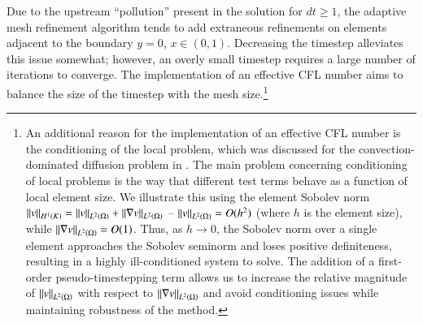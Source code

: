 Due to the upstream ``pollution'' present in the solution for $dt \geq 1$, the adaptive mesh refinement algorithm tends to add extraneous refinements on elements adjacent to the boundary $y = 0$, $x\in (0,1)$.  Decreasing the timestep alleviates this issue somewhat; however, an overly small timestep requires a large number of iterations to converge.  The implementation of an effective CFL number aims to balance the size of the timestep with the mesh size.\footnote{An additional reason for the implementation of an effective CFL number is the conditioning of the local problem, which was discussed for the convection-dominated diffusion problem in \cite{DPG3}.  The main problem concerning conditioning of local problems is the way that different test terms behave as a function of local element size.  We illustrate this using the element Sobolev norm $\nor{v}_{H^1(K)} = \nor{v}_{\L} + \nor{\grad v}_{\L}$ -- $\nor{v}_{\L} = O(h^2)$ (where $h$ is the element size), while $\nor{\grad v}_{\L} = O(1)$.  Thus, as $h\rightarrow 0$, the Sobolev norm over a single element approaches the Sobolev seminorm and loses positive definiteness, resulting in a highly ill-conditioned system to solve.  The addition of a first-order pseudo-timestepping term allows us to increase the relative magnitude of $\nor{v}_{\L}$ with respect to $\nor{\grad v}_{\L}$ and avoid conditioning issues while maintaining robustness of the method.}  

